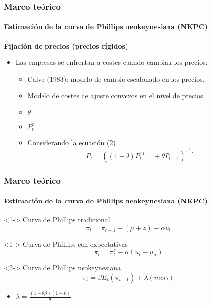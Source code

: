 \documentclass[10pt]{beamer}
\begin{document}
\begin{frame}
\frametitle{Marco teórico}
\framesubtitle{Estimación de la curva de Phillips neokeynesiana (NKPC)}
\textbf{Fijación de precios (precios rígidos)}
\begin{itemize}
\item<1-> Las empresas se enfrentan a costes cuando cambian los precios:
\begin{itemize}
\item<1-> Calvo (1983): modelo de cambio escalonado en los precios.
\item<1-> Modelo de costes de ajuste convexos en el nivel de precios.
\end{itemize}
\begin{itemize}
\item<2-> $\theta$
\item<2-> $P_{t}^*$
\item<3-> Considerando la ecuación (2)
\begin{equation*}
P_{t}=((1-\theta)P_{t}^{*1-\epsilon}+\theta P_{t-1}) ^\frac{1}{1-\epsilon}
\end{equation*}
 \end{itemize}
 \end{itemize}
\end{frame}



\begin{frame}
\frametitle{Marco teórico}
\framesubtitle{Estimación de la curva de Phillips neokeynesiana (NKPC)}
\begin{block}<1-> {Curva de Phillips tradicional}
\begin{equation*}
\pi_t=\pi_{t-1}+(\mu+z)-\alpha u_{t}
\end{equation*}
\end{block}
\begin{block}<1-> {Curva de Phillips con expectativas}
\begin{equation*}
\pi_t=\pi_{t}^e-\alpha (u_{t}-u_{n})
\end{equation*}
\end{block}
\begin{alertblock}<2-> {Curva de Phillips neokeynesiana}
\begin{equation*}
\pi_{t}=\beta E_{t}(\pi_{t+1})+\lambda(mcr_{t})
\end{equation*}
\end{alertblock}
\begin{itemize}
\item<2-> $\lambda =\frac{(1-\theta\beta)(1-\theta)}{\theta} $
\end{itemize}
\end{frame}
\end{document}
